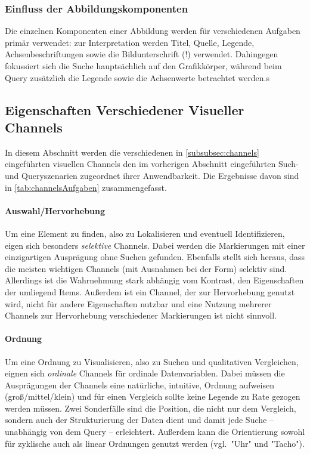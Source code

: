 			\subsubsection{Einfluss der Abbildungskomponenten}
				Die einzelnen Komponenten einer Abbildung werden für verschiedenen Aufgaben primär verwendet: zur Interpretation werden Titel, Quelle, Legende, Achsenbeschriftungen sowie die Bildunterschrift (!) verwendet. Dahingegen fokussiert sich die Suche hauptsächlich auf den Grafikkörper, während beim Query zusätzlich die Legende sowie die Achsenwerte betrachtet werden.s

		\subsection{Eigenschaften Verschiedener Visueller Channels}
			In diesem Abschnitt werden die verschiedenen in \autoref{subsubsec:channels} eingeführten visuellen Channels den im vorherigen Abschnitt eingeführten Such- und Queryszenarien zugeordnet \bzgl ihrer Anwendbarkeit. Die Ergebnisse davon sind in \autoref{tab:channelsAufgaben} zusammengefasst.

			\paragraph{Auswahl/Hervorhebung}
				Um eine Element zu finden, also zu Lokalisieren und eventuell Identifizieren, eigen sich besonders \emph{selektive} Channels. Dabei werden die Markierungen mit einer einzigartigen Ausprägung ohne Suchen gefunden. Ebenfalls stellt sich heraus, dass die meisten wichtigen Channels (mit Ausnahmen bei der Form) selektiv sind. Allerdings ist die Wahrnehmung stark abhängig vom Kontrast, \dh den Eigenschaften der umliegend Items. Außerdem ist ein Channel, der zur Hervorhebung genutzt wird, nicht für andere Eigenschaften nutzbar und eine Nutzung mehrerer Channels zur Hervorhebung verschiedener Markierungen ist nicht sinnvoll.

			\paragraph{Ordnung}
				Um eine Ordnung zu Visualisieren, also zu Suchen und qualitativen Vergleichen, eignen sich \emph{ordinale} Channels für ordinale Datenvariablen. Dabei müssen die Ausprägungen der Channels eine natürliche, intuitive, Ordnung aufweisen (\zB groß/mittel/klein) und für einen Vergleich sollte keine Legende zu Rate gezogen werden müssen. Zwei Sonderfälle sind die Position, die nicht nur dem Vergleich, sondern auch der Strukturierung der Daten dient und damit jede Suche -- unabhängig von dem Query -- erleichtert. Außerdem kann die Orientierung sowohl für zyklische auch als linear Ordnungen genutzt werden (vgl.~"Uhr" und "Tacho").

